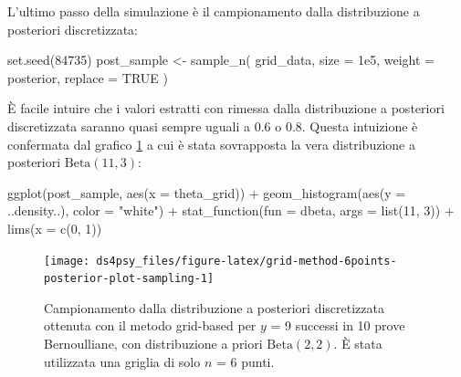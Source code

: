 \documentclass[
  11pt,
]{krantz}
\makeatletter
\newenvironment{Shaded}{\begin{snugshade}}{\end{snugshade}}
\newcommand{\AttributeTok}[1]{\textcolor[rgb]{0.61,0.61,0.61}{#1}}
\newcommand{\ConstantTok}[1]{\textcolor[rgb]{0,0,0}{#1}}
\newcommand{\DecValTok}[1]{\textcolor[rgb]{0.06,0.06,0.06}{#1}}
\newcommand{\FloatTok}[1]{\textcolor[rgb]{0.06,0.06,0.06}{#1}}
\newcommand{\FunctionTok}[1]{\textcolor[rgb]{0,0,0}{#1}}
\newcommand{\NormalTok}[1]{#1}
\newcommand{\OtherTok}[1]{\textcolor[rgb]{0.37,0.37,0.37}{#1}}
\newcommand{\SpecialCharTok}[1]{\textcolor[rgb]{0,0,0}{#1}}
\newcommand{\StringTok}[1]{\textcolor[rgb]{0.5,0.5,0.5}{#1}}
\newenvironment{kframe}{%
\medskip{}
\setlength{\fboxsep}{.8em}
 \def\at@end@of@kframe{}%
 \ifinner\ifhmode%
  \def\at@end@of@kframe{\end{minipage}}%
  \begin{minipage}{\columnwidth}%
 \fi\fi%
 \def\FrameCommand##1{\hskip\@totalleftmargin \hskip-\fboxsep
 \colorbox{shadecolor}{##1}\hskip-\fboxsep
     \hskip-\linewidth \hskip-\@totalleftmargin \hskip\columnwidth}%
 \MakeFramed {\advance\hsize-\width
   \@totalleftmargin\z@ \linewidth\hsize
   \@setminipage}}%
 {\par\unskip\endMakeFramed%
 \at@end@of@kframe}
\renewenvironment{Shaded}{\begin{kframe}}{\end{kframe}}
\theoremstyle{definition}
\theoremstyle{definition}
\theoremstyle{definition}
\theoremstyle{definition}
\theoremstyle{remark}
\makeatother
\begin{document}
L'ultimo passo della simulazione è il campionamento dalla distribuzione a posteriori discretizzata:

\begin{Shaded}
\begin{Highlighting}[]
\FunctionTok{set.seed}\NormalTok{(}\DecValTok{84735}\NormalTok{)}
\NormalTok{post\_sample }\OtherTok{\textless{}{-}} \FunctionTok{sample\_n}\NormalTok{(}
\NormalTok{  grid\_data,}
  \AttributeTok{size =} \FloatTok{1e5}\NormalTok{,}
  \AttributeTok{weight =}\NormalTok{ posterior,}
  \AttributeTok{replace =} \ConstantTok{TRUE}
\NormalTok{)}
\end{Highlighting}
\end{Shaded}

È facile intuire che i valori estratti con rimessa dalla distribuzione a posteriori discretizzata saranno quasi sempre uguali a 0.6 o 0.8. Questa intuizione è confermata dal grafico \ref{fig:grid-method-6points-posterior-plot-sampling} a cui è stata sovrapposta la vera distribuzione a posteriori \(\mbox{Beta}(11, 3)\):

\begin{Shaded}
\begin{Highlighting}[]
\FunctionTok{ggplot}\NormalTok{(post\_sample, }\FunctionTok{aes}\NormalTok{(}\AttributeTok{x =}\NormalTok{ theta\_grid)) }\SpecialCharTok{+}
  \FunctionTok{geom\_histogram}\NormalTok{(}\FunctionTok{aes}\NormalTok{(}\AttributeTok{y =}\NormalTok{ ..density..), }\AttributeTok{color =} \StringTok{"white"}\NormalTok{) }\SpecialCharTok{+}
  \FunctionTok{stat\_function}\NormalTok{(}\AttributeTok{fun =}\NormalTok{ dbeta, }\AttributeTok{args =} \FunctionTok{list}\NormalTok{(}\DecValTok{11}\NormalTok{, }\DecValTok{3}\NormalTok{)) }\SpecialCharTok{+}
  \FunctionTok{lims}\NormalTok{(}\AttributeTok{x =} \FunctionTok{c}\NormalTok{(}\DecValTok{0}\NormalTok{, }\DecValTok{1}\NormalTok{))}
\end{Highlighting}
\end{Shaded}

\begin{figure}[h]

{\centering \texttt{[image: ds4psy\_files/figure-latex/grid-method-6points-posterior-plot-sampling-1]} 

}

\caption{Campionamento dalla  distribuzione a posteriori discretizzata ottenuta con il metodo grid-based per $y$ = 9 successi in 10 prove Bernoulliane, con distribuzione a priori $\mbox{Beta}(2, 2)$. È stata utilizzata una griglia di solo $n$ = 6 punti.}\label{fig:grid-method-6points-posterior-plot-sampling}
\end{figure}
\end{document}
